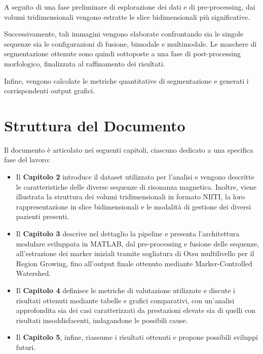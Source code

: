 A seguito di una fase preliminare di esplorazione dei dati e di pre-processing, dai volumi tridimensionali vengono estratte le slice bidimensionali più significative.

Successivamente, tali immagini vengono elaborate confrontando sia le singole sequenze sia le configurazioni di fusione, bimodale e multimodale. Le maschere di segmentazione ottenute sono quindi sottoposte a una fase di post-processing morfologico, finalizzata al raffinamento dei risultati.

Infine, vengono calcolate le metriche quantitative di segmentazione e generati i corrispondenti output grafici.

\section{Struttura del Documento}
Il documento è articolato nei seguenti capitoli, ciascuno dedicato a una specifica fase del lavoro:

\begin{itemize}
    \item Il \textbf{Capitolo 2} introduce il dataset utilizzato per l’analisi e vengono descritte le caratteristiche delle diverse sequenze di risonanza magnetica. Inoltre, viene illustrata la struttura dei volumi tridimensionali in formato NIfTI, la loro rappresentazione in slice bidimensionali e le modalità di gestione dei diversi pazienti presenti.

    \item Il \textbf{Capitolo 3} descrive nel dettaglio la pipeline e presenta l’architettura modulare sviluppata in MATLAB, dal pre-processing e fusione delle sequenze, all’estrazione dei marker iniziali tramite sogliatura di Otsu multilivello per il Region Growing, fino all’output finale ottenuto mediante Marker-Controlled Watershed.

    \item Il \textbf{Capitolo 4} definisce le metriche di valutazione utilizzate e discute i risultati ottenuti mediante tabelle e grafici comparativi, con un’analisi approfondita sia dei casi caratterizzati da prestazioni elevate sia di quelli con risultati insoddisfacenti, indagandone le possibili cause.

    \item Il \textbf{Capitolo 5}, infine, riassume i risultati ottenuti e propone possibili sviluppi futuri.
\end{itemize}